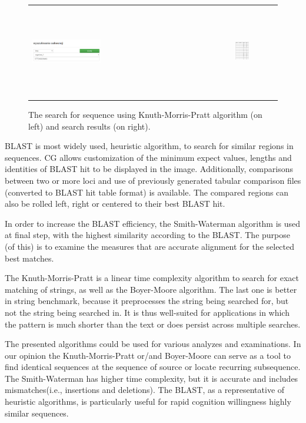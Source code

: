 \documentclass[]{spie}
\newcommand{\appShortcut}{CG}
\begin{document}
\begin{figure}[htp]
  \centering
  \begin{tabular}{ll}
    \includegraphics[width=0.35\textwidth]{img/search.png}
    &
    \includegraphics[width=0.35\textwidth, height=4cm]{img/search_results.png}
  \end{tabular}
  \caption{The search for sequence using Knuth-Morris-Pratt algorithm (on left) and search results (on right).}
  \label{fig:search}
\end{figure}

BLAST is most widely used, heuristic algorithm, to search for similar regions in sequences.
\appShortcut{} allows customization of the minimum expect values, lengths and identities of BLAST hit to be displayed in the image.
Additionally, comparisons between two or more loci and use of previously generated tabular comparison files (converted to BLAST hit table format) is available.
The compared regions can also be rolled left, right or centered to their best BLAST hit.

In order to increase the BLAST efficiency, the Smith-Waterman algorithm is used at final step, with the highest similarity according to the BLAST.
The purpose (of this) is to examine the measures that are accurate alignment for the selected best matches.

The Knuth-Morris-Pratt is a linear time complexity algorithm to search for exact matching of strings, as well as the Boyer-Moore algorithm.
The last one is better in string benchmark, because it preprocesses the string being searched for, but not the string being searched in.
It is thus well-suited for applications in which the pattern is much shorter than the text or does persist across multiple searches.

The presented algorithms could be used for various analyzes and examinations.
In our opinion the Knuth-Morris-Pratt or/and Boyer-Moore can serve as a tool to find identical sequences
at the sequence of source or locate recurring subsequence.
The Smith-Waterman has higher time complexity, but it is accurate and includes mismatches(i.e., insertions and deletions).
The BLAST, as a representative of heuristic algorithms, is particularly useful for rapid cognition willingness highly similar sequences.
\end{document}
